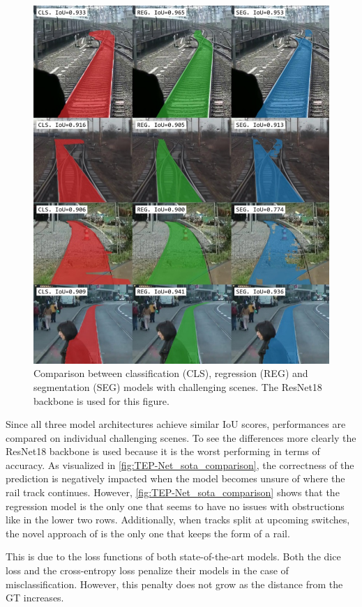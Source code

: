 \begin{figure}[H]
    \centering
    \includegraphics[width=0.7\linewidth]{PICs/Baselinepaper/comparison_sota_tep-net.jpg}
    \caption{Comparison between classification (CLS), regression (REG) and segmentation (SEG) models with challenging scenes.
    The ResNet18 backbone is used for this figure.}
    \label{fig:TEP-Net_sota_comparison}
\end{figure}

Since all three model architectures achieve similar \ac{IoU} scores, performances are compared on individual challenging scenes.
To see the differences more clearly the ResNet18 backbone is used because it is the worst performing in terms of accuracy.
As visualized in \autoref{fig:TEP-Net_sota_comparison}, the correctness of the prediction is negatively impacted when the model becomes unsure of where the rail track continues.
However, \autoref{fig:TEP-Net_sota_comparison} shows that the regression model is the only one that seems to have no issues with obstructions like in the lower two rows.
Additionally, when tracks split at upcoming switches, the novel approach of \cite{tepNet2024} is the only one that keeps the form of a rail.

This is due to the loss functions of both state-of-the-art models.
Both the dice loss and the cross-entropy loss penalize their models in the case of misclassification.
However, this penalty does not grow as the distance from the \ac{GT} increases.

